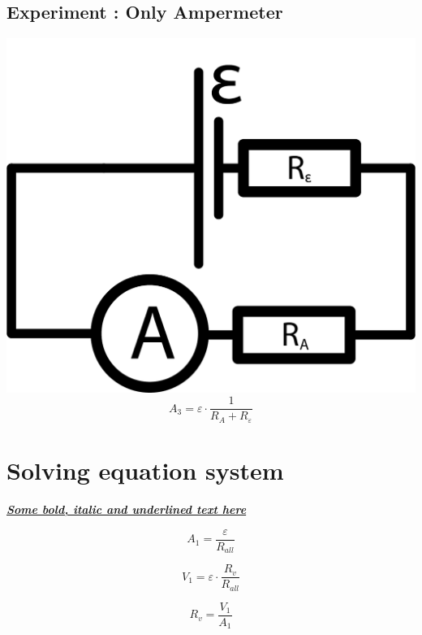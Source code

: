 \documentclass[12pt]{memoir}
\begin{document}
    \subsection{Experiment : Only Ampermeter}\label{subsec:experiment-3}
    \includegraphics[width=\linewidth]{images/schemes/OnlyAmperemeter.png}
    \begin{equation*}
        A_3 = \varepsilon \cdot \frac{1}{R_A + R_\varepsilon}
    \end{equation*}

    \newpage

    \section{Solving equation system}\label{sec:solving-equation-system}

    \underline{\textit{\textbf{Some bold, italic and underlined text here}}}

    \begin{equation}
        A_1 = \frac{\varepsilon}{R_{all}}\label{eq:equation1}
    \end{equation}

    \begin{equation}
        V_1 = \varepsilon \cdot \frac{R_v}{R_{all}}\label{eq:equation2}
    \end{equation}

    \begin{equation*}
        R_v = \frac{V_1}{A_1}
    \end{equation*}
\end{document}
